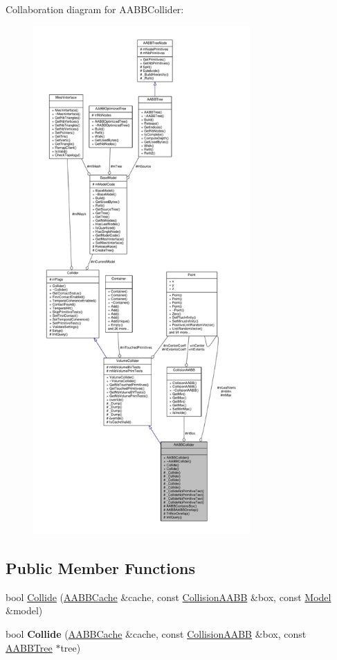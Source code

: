 Collaboration diagram for A\+A\+B\+B\+Collider\+:
\nopagebreak
\begin{figure}[H]
\begin{center}
\leavevmode
\includegraphics[height=550pt]{d6/daa/classAABBCollider__coll__graph}
\end{center}
\end{figure}
\subsection*{Public Member Functions}
\begin{DoxyCompactItemize}
\item 
bool \hyperlink{classAABBCollider_a6c5443558bd612a744bbfc74ff2b7368}{Collide} (\hyperlink{structAABBCache}{A\+A\+B\+B\+Cache} \&cache, const \hyperlink{classCollisionAABB}{Collision\+A\+A\+BB} \&box, const \hyperlink{classModel}{Model} \&model)
\item 
bool {\bfseries Collide} (\hyperlink{structAABBCache}{A\+A\+B\+B\+Cache} \&cache, const \hyperlink{classCollisionAABB}{Collision\+A\+A\+BB} \&box, const \hyperlink{classAABBTree}{A\+A\+B\+B\+Tree} $\ast$tree)\hypertarget{classAABBCollider_ad26d4fe09769619954dad20961c56f78}{}\label{classAABBCollider_ad26d4fe09769619954dad20961c56f78}

\end{DoxyCompactItemize}
